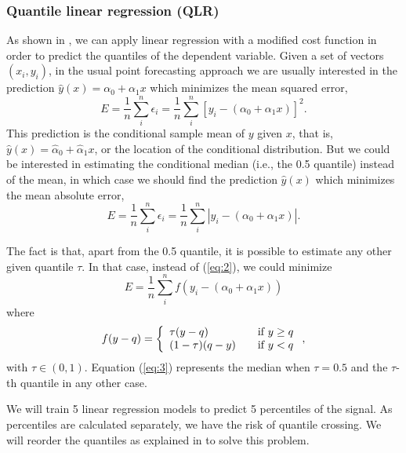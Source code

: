 \documentclass[a4paper,twocolumn,5p]{elsarticle}
\begin{document}
\subsubsection{Quantile linear regression (QLR)}

As shown in \cite{koenker_quantile_2001}, we can apply linear
regression with a modified cost function in order to predict the
quantiles of the dependent variable.  Given a set of vectors
$(x_i, y_i)$, in the usual point forecasting approach we are usually
interested in the prediction $\hat y(x) = \alpha_0 + \alpha_1 x$ which
minimizes the mean squared error,
\begin{equation}
  \label{eq:1}
  E = \frac{1}{n} \sum^n_i \epsilon_i =
  \frac{1}{n} \sum^n_i [ y_i - (\alpha_0 + \alpha_1 x) ]^2.
\end{equation}
This prediction is the conditional sample mean of $y$ given $x$, that
is, $\hat y(x) = \hat\alpha_0 + \hat\alpha_1 x$, or the location of
the conditional distribution. But we could be interested in estimating
the conditional median (i.e., the 0.5 quantile) instead of the mean,
in which case we should find the prediction $\hat y(x)$ which
minimizes the mean absolute error,
\begin{equation}
  \label{eq:2}
  E = \frac{1}{n} \sum^n_i \epsilon_i =
  \frac{1}{n} \sum^n_i | y_i - (\alpha_0 + \alpha_1 x) |.
\end{equation}

The fact is that, apart from the 0.5 quantile, it is possible to
estimate any other given quantile $\tau$. In that case, instead of
(\ref{eq:2}), we could minimize
\begin{equation}
  \label{eq:3}
  E= \frac{1}{n} \sum^n_i f( y_i - (\alpha_0 + \alpha_1 x))
\end{equation}
where
\begin{equation}
  \label{eq:4}
  f(y-q) = \left\{ 
    \begin{array}{l l}
      \tau (y-q) & \quad \mbox{if $y \ge q$}\\
      (1-\tau) (q-y) & \quad \mbox{if $y < q$}\\
    \end{array} \right.,
\end{equation}
with $\tau \in (0,1)$. Equation (\ref{eq:3}) represents the median
when $\tau=0.5$ and the $\tau$-th quantile in any other case.

We will train 5 linear regression models to predict 5 percentiles of
the signal. As percentiles are calculated separately, we have the risk
of quantile crossing.  We will reorder the quantiles as explained in
\cite{cross} to solve this problem.
\end{document}
